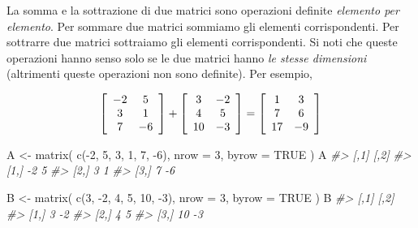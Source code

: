 \documentclass[
  11pt,
]{krantz}
\makeatletter
\newenvironment{Shaded}{\begin{snugshade}}{\end{snugshade}}
\newcommand{\AttributeTok}[1]{\textcolor[rgb]{0.61,0.61,0.61}{#1}}
\newcommand{\CommentTok}[1]{\textcolor[rgb]{0.37,0.37,0.37}{\textit{#1}}}
\newcommand{\ConstantTok}[1]{\textcolor[rgb]{0,0,0}{#1}}
\newcommand{\DecValTok}[1]{\textcolor[rgb]{0.06,0.06,0.06}{#1}}
\newcommand{\FunctionTok}[1]{\textcolor[rgb]{0,0,0}{#1}}
\newcommand{\NormalTok}[1]{#1}
\newcommand{\OtherTok}[1]{\textcolor[rgb]{0.37,0.37,0.37}{#1}}
\newcommand{\SpecialCharTok}[1]{\textcolor[rgb]{0,0,0}{#1}}
\newenvironment{kframe}{%
\medskip{}
\setlength{\fboxsep}{.8em}
 \def\at@end@of@kframe{}%
 \ifinner\ifhmode%
  \def\at@end@of@kframe{\end{minipage}}%
  \begin{minipage}{\columnwidth}%
 \fi\fi%
 \def\FrameCommand##1{\hskip\@totalleftmargin \hskip-\fboxsep
 \colorbox{shadecolor}{##1}\hskip-\fboxsep
     \hskip-\linewidth \hskip-\@totalleftmargin \hskip\columnwidth}%
 \MakeFramed {\advance\hsize-\width
   \@totalleftmargin\z@ \linewidth\hsize
   \@setminipage}}%
 {\par\unskip\endMakeFramed%
 \at@end@of@kframe}
\renewenvironment{Shaded}{\begin{kframe}}{\end{kframe}}
\theoremstyle{definition}
\theoremstyle{definition}
\theoremstyle{definition}
\theoremstyle{definition}
\theoremstyle{remark}
\makeatother
\begin{document}
La somma e la sottrazione di due matrici sono operazioni definite \emph{elemento per elemento}. Per sommare due matrici sommiamo gli elementi corrispondenti. Per sottrarre due matrici sottraiamo gli elementi corrispondenti. Si noti che queste operazioni hanno senso solo se le due matrici hanno \emph{le stesse dimensioni} (altrimenti queste operazioni non sono definite). Per esempio,

\[
\left[ \begin{array}{c c}
-2 & 5\\
3 & 1\\
7 & -6
\end{array}
 \right]+
\left[ \begin{array}{c c}
3 & -2\\
4 & 5\\
10 & -3
\end{array}
 \right]=
 \left[ \begin{array}{c c}
1 & 3\\
7 & 6\\
17 & -9
\end{array}
 \right]
 \]

\begin{Shaded}
\begin{Highlighting}[]
\NormalTok{A }\OtherTok{\textless{}{-}} \FunctionTok{matrix}\NormalTok{(}
  \FunctionTok{c}\NormalTok{(}\SpecialCharTok{{-}}\DecValTok{2}\NormalTok{, }\DecValTok{5}\NormalTok{, }\DecValTok{3}\NormalTok{, }\DecValTok{1}\NormalTok{, }\DecValTok{7}\NormalTok{, }\SpecialCharTok{{-}}\DecValTok{6}\NormalTok{),}
  \AttributeTok{nrow =} \DecValTok{3}\NormalTok{, }\AttributeTok{byrow =} \ConstantTok{TRUE}
\NormalTok{)}
\NormalTok{A}
\CommentTok{\#\textgreater{}      [,1] [,2]}
\CommentTok{\#\textgreater{} [1,]   {-}2    5}
\CommentTok{\#\textgreater{} [2,]    3    1}
\CommentTok{\#\textgreater{} [3,]    7   {-}6}
\end{Highlighting}
\end{Shaded}

\begin{Shaded}
\begin{Highlighting}[]
\NormalTok{B }\OtherTok{\textless{}{-}} \FunctionTok{matrix}\NormalTok{(}
  \FunctionTok{c}\NormalTok{(}\DecValTok{3}\NormalTok{, }\SpecialCharTok{{-}}\DecValTok{2}\NormalTok{, }\DecValTok{4}\NormalTok{, }\DecValTok{5}\NormalTok{, }\DecValTok{10}\NormalTok{, }\SpecialCharTok{{-}}\DecValTok{3}\NormalTok{),}
  \AttributeTok{nrow =} \DecValTok{3}\NormalTok{, }\AttributeTok{byrow =} \ConstantTok{TRUE}
\NormalTok{)}
\NormalTok{B}
\CommentTok{\#\textgreater{}      [,1] [,2]}
\CommentTok{\#\textgreater{} [1,]    3   {-}2}
\CommentTok{\#\textgreater{} [2,]    4    5}
\CommentTok{\#\textgreater{} [3,]   10   {-}3}
\end{Highlighting}
\end{Shaded}
\end{document}
